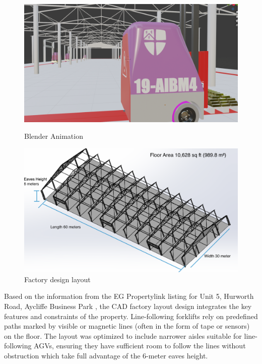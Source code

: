\documentclass[12pt]{article}
\begin{document}
\begin{figure}[ht]
    \centering
    \begin{minipage}{0.45\linewidth}
        \centering
        \includegraphics[width=\linewidth]{blender_animation.png} %
        \caption{Blender Animation}
        \label{fig:blender_animation}
    \end{minipage}
    \hspace{0.05\linewidth}
    \begin{minipage}{0.45\linewidth}
        \centering
        \includegraphics[width=\linewidth]{factory layout dimension.png}
        \caption{Factory design layout}
        \label{fig:factory_layout}
    \end{minipage}
\end{figure}

 


Based on the information from the EG Propertylink listing for Unit 5, Hurworth Road, Aycliffe Business Park \cite{mileway_hurworth_2024}, the CAD factory layout design integrates the key features and constraints of the property.  Line-following forklifts rely on predefined paths marked by visible or magnetic lines (often in the form of tape or sensors) on the floor. The layout was optimized to include narrower aisles suitable for line-following AGVs,  ensuring they have sufficient room to follow the lines without obstruction which take full advantage of the 6-meter eaves height.
\end{document}
